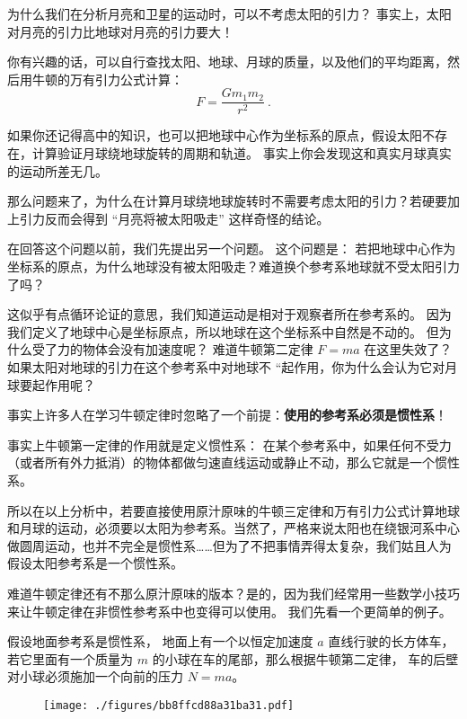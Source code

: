 
为什么我们在分析月亮和卫星的运动时，可以不考虑太阳的引力？ 事实上，太阳对月亮的引力比地球对月亮的引力要大！

你有兴趣的话，可以自行查找太阳、地球、月球的质量，以及他们的平均距离，然后用牛顿的万有引力公式计算：
\begin{equation}
F = \frac{Gm_1m_2}{r^2}~.
\end{equation}

如果你还记得高中的知识，也可以把地球中心作为坐标系的原点，假设太阳不存在，计算验证月球绕地球旋转的周期和轨道。 事实上你会发现这和真实月球真实的运动所差无几。

那么问题来了，为什么在计算月球绕地球旋转时不需要考虑太阳的引力？若硬要加上引力反而会得到 “月亮将被太阳吸走” 这样奇怪的结论。

在回答这个问题以前，我们先提出另一个问题。 这个问题是： 若把地球中心作为坐标系的原点，为什么地球没有被太阳吸走？难道换个参考系地球就不受太阳引力了吗？

这似乎有点循环论证的意思，我们知道运动是相对于观察者所在参考系的。 因为我们定义了地球中心是坐标原点，所以地球在这个坐标系中自然是不动的。 但为什么受了力的物体会没有加速度呢？ 难道牛顿第二定律 $F = ma$ 在这里失效了？ 如果太阳对地球的引力在这个参考系中对地球不 “起作用，你为什么会认为它对月球要起作用呢？

事实上许多人在学习牛顿定律时忽略了一个前提：\textbf{使用的参考系必须是惯性系}！

事实上牛顿第一定律的作用就是定义惯性系： 在某个参考系中，如果任何不受力（或者所有外力抵消）的物体都做匀速直线运动或静止不动，那么它就是一个惯性系。

所以在以上分析中，若要直接使用原汁原味的牛顿三定律和万有引力公式计算地球和月球的运动，必须要以太阳为参考系。当然了，严格来说太阳也在绕银河系中心做圆周运动，也并不完全是惯性系……但为了不把事情弄得太复杂，我们姑且人为假设太阳参考系是一个惯性系。

难道牛顿定律还有不那么原汁原味的版本？是的，因为我们经常用一些数学小技巧来让牛顿定律在非惯性参考系中也变得可以使用。 我们先看一个更简单的例子。

假设地面参考系是惯性系， 地面上有一个以恒定加速度 $a$ 直线行驶的长方体车， 若它里面有一个质量为 $m$ 的小球在车的尾部，那么根据牛顿第二定律， 车的后壁对小球必须施加一个向前的压力 $N = ma$。

\begin{figure}[ht]
\centering
\texttt{[image: ./figures/bb8ffcd88a31ba31.pdf]}
\caption{} \label{fig_EquivI_1}
\end{figure}

